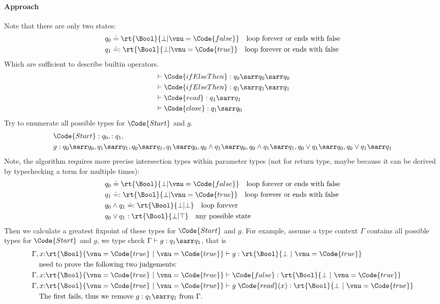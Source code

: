 \paragraph{Approach} Note that there are only two states:
\begin{align*}
    &q_0 \doteq \rt{\Bool}{\bot | \vnu = \Code{false}} \quad \text{loop forever or ends with false}
    \\&q_1 \doteq : \rt{\Bool}{\bot | \vnu = \Code{true}} \quad \text{loop forever or ends with false}
\end{align*}\noindent
Which are sufficient to describe builtin operators.
\begin{align*}
    & \vdash \Code{ifElseThen} : q_0 \sarr q_0 \sarr q_0
    \\& \vdash \Code{ifElseThen} : q_1 \sarr q_1 \sarr q_1
    \\& \vdash \Code{read} : q_1 \sarr q_1
    \\& \vdash \Code{close} : q_1 \sarr q_0
\end{align*}\noindent
Try to enumerate all possible types for $\Code{Start}$ and $g$.
\begin{align*}
    &\Code{Start} : q_0, : q_1, 
    \\&g : q_0 \sarr q_0, q_1 \sarr q_1, q_0 \sarr q_1, q_1 \sarr q_0, q_0 \land q_1 \sarr q_0, q_0 \land q_1 \sarr q_1, q_0 \lor q_1 \sarr q_0, q_0 \lor q_1 \sarr q_1
\end{align*}\noindent
Note, the algorithm requires more precise intersection types within parameter types (not for return type, maybe because it can be derived by typechecking a term for multiple times):
\begin{align*}
    &q_0 \doteq \rt{\Bool}{\bot | \vnu = \Code{false}} \quad \text{loop forever or ends with false}
    \\&q_1 \doteq : \rt{\Bool}{\bot | \vnu = \Code{true}} \quad \text{loop forever or ends with false}
    \\&q_0 \land q_1 \doteq : \rt{\Bool}{\bot | \bot} \quad \text{loop forever}
    \\&q_0 \lor q_1 : \rt{\Bool}{\bot | \top} \quad \text{any possible state}
\end{align*}\noindent
Then we calculate a greatest fixpoint of these types for $\Code{Start}$ and $g$. For example, assume a type context $\Gamma$ contains all possible types for $\Code{Start}$ and $g$, we type check $\Gamma \vdash g: q_1 \sarr q_1$, that is
\begin{align*}
    &\Gamma, x{:}\rt{\Bool}{\vnu = \Code{true} ~|~ \vnu = \Code{true}} \vdash g: \rt{\Bool}{\bot ~|~ \vnu = \Code{true}}
    \\&\quad \text{need to prove the following two judgements:}
    \\&\Gamma, x{:}\rt{\Bool}{\vnu = \Code{true} ~|~ \vnu = \Code{true}} \vdash \Code{false} : \rt{\Bool}{\bot ~|~ \vnu = \Code{true}}
    \\&\Gamma, x{:}\rt{\Bool}{\vnu = \Code{true} ~|~ \vnu = \Code{true}} \vdash g\; \Code{read}(x) : \rt{\Bool}{\bot ~|~ \vnu = \Code{true}}
    \\&\quad \text{The first fails, thus we remove $g: q_1 \sarr q_1$ from $\Gamma$. }
\end{align*}\noindent

